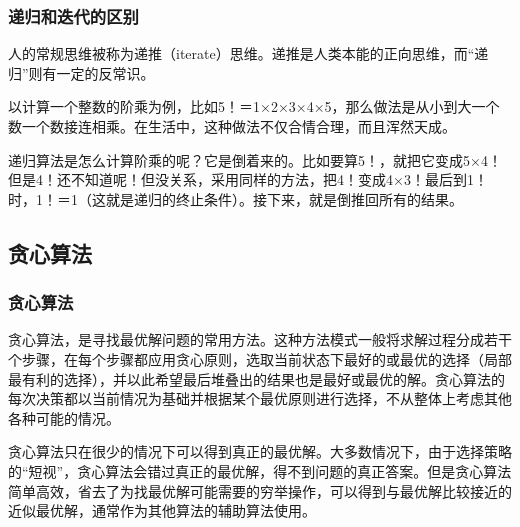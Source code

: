 \begin{frame}
    \frametitle{递归和迭代的区别}    
    \begin{center}      
      {\Large {}}

      {\Large {}}

    \end{center}

    人的常规思维被称为递推（iterate）思维。递推是人类本能的正向思维，而“递归”则有一定的反常识。

    以计算一个整数的阶乘为例，比如5！＝1×2×3×4×5，那么做法是从小到大一个数一个数接连相乘。在生活中，这种做法不仅合情合理，而且浑然天成。
    
    递归算法是怎么计算阶乘的呢？它是倒着来的。比如要算5！，就把它变成5×4！但是4！还不知道呢！但没关系，采用同样的方法，把4！变成4×3！最后到1！时，1！＝1（这就是递归的终止条件）。接下来，就是倒推回所有的结果。

      \begin{center}      
      {\Large {}}
    \end{center}

    
\end{frame}

\subsection{贪心算法}

\begin{frame}
    \frametitle{贪心算法}
    贪心算法，是寻找最优解问题的常用方法。这种方法模式一般将求解过程分成若干个步骤，在每个步骤都应用贪心原则，选取当前状态下最好的或最优的选择（局部最有利的选择），并以此希望最后堆叠出的结果也是最好或最优的解。贪心算法的每次决策都以当前情况为基础并根据某个最优原则进行选择，不从整体上考虑其他各种可能的情况。
    \bigskip

    贪心算法只在很少的情况下可以得到真正的最优解。大多数情况下，由于选择策略的“短视”，贪心算法会错过真正的最优解，得不到问题的真正答案。但是贪心算法简单高效，省去了为找最优解可能需要的穷举操作，可以得到与最优解比较接近的近似最优解，通常作为其他算法的辅助算法使用。
\end{frame}


